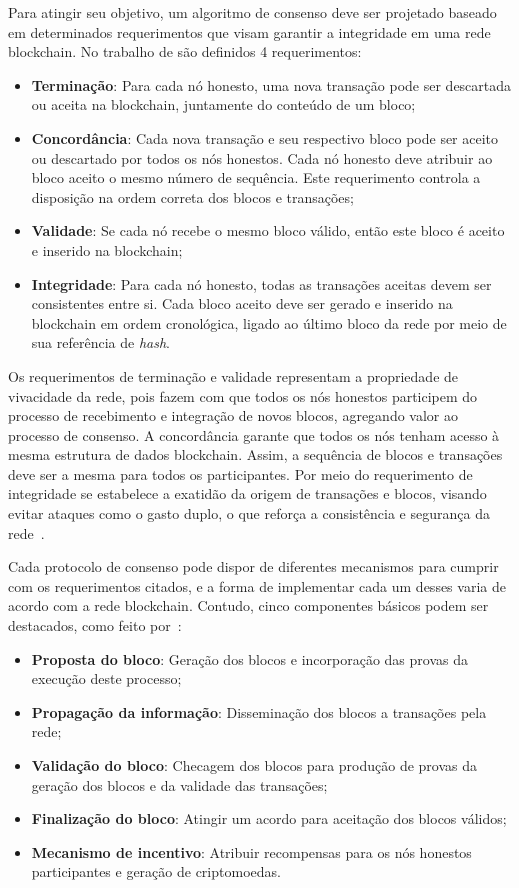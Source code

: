 Para atingir seu objetivo, um algoritmo de consenso deve ser projetado baseado em determinados requerimentos que visam garantir a integridade em uma rede blockchain. No trabalho de  são definidos 4 requerimentos:

\begin{itemize}
    \item \textbf{Terminação}: Para cada nó honesto, uma nova transação pode ser descartada ou aceita na blockchain, juntamente do conteúdo de um bloco;
    \item \textbf{Concordância}: Cada nova transação e seu respectivo bloco pode ser aceito ou descartado por todos os nós honestos. Cada nó honesto deve atribuir ao bloco aceito o mesmo número de sequência. Este requerimento controla a disposição na ordem correta dos blocos e transações;
    \item \textbf{Validade}: Se cada nó recebe o mesmo bloco válido, então este bloco é aceito e inserido na blockchain;
    \item \textbf{Integridade}: Para cada nó honesto, todas as transações aceitas devem ser consistentes entre si. Cada bloco aceito deve ser gerado e inserido na blockchain em ordem cronológica, ligado ao último bloco da rede por meio de sua referência de \textit{hash}.
\end{itemize} 

Os requerimentos de terminação e validade representam a propriedade de vivacidade da rede, pois fazem com que todos os nós honestos participem do processo de recebimento e integração de novos blocos, agregando valor ao processo de consenso. A concordância garante que todos os nós tenham acesso à mesma estrutura de dados blockchain. Assim, a sequência de blocos e transações deve ser a mesma para todos os participantes. Por meio do requerimento de integridade se estabelece a exatidão da origem de transações e blocos, visando evitar ataques como o gasto duplo, o que reforça a consistência e segurança da rede~\cite{consenso-xiao-2020, consenso-Bouraga2021}.

Cada protocolo de consenso pode dispor de diferentes mecanismos para cumprir com os requerimentos citados, e a forma de implementar cada um desses varia de acordo com a rede blockchain. Contudo, cinco componentes básicos podem ser destacados, como feito por~: 

\begin{itemize}
    \item \textbf{Proposta do bloco}: Geração dos blocos e incorporação das provas da execução deste processo;
    \item \textbf{Propagação da informação}: Disseminação dos blocos a transações pela rede;
    \item \textbf{Validação do bloco}: Checagem dos blocos para produção de provas da geração dos blocos e da validade das transações;
    \item \textbf{Finalização do bloco}: Atingir um acordo para aceitação dos blocos válidos;
    \item \textbf{Mecanismo de incentivo}: Atribuir recompensas para os nós honestos participantes e geração de criptomoedas.
\end{itemize}